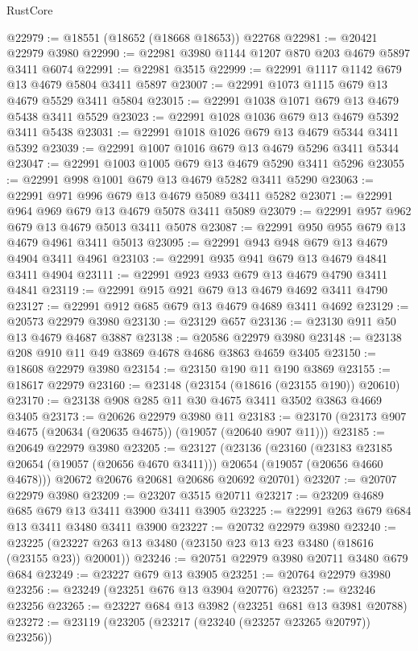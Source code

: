 \begin{lexlean}{RustCore}
\begin{coremodule}
@22979 := @18551 (@18652 (@18668 @18653)) @22768
@22981 := @20421 @22979 @3980
@22990 := @22981 @3980 @1144 @1207 @870 @203 @4679 @5897 @3411 @6074
@22991 := @22981 @3515
@22999 := @22991 @1117 @1142 @679 @13 @4679 @5804 @3411 @5897
@23007 := @22991 @1073 @1115 @679 @13 @4679 @5529 @3411 @5804
@23015 := @22991 @1038 @1071 @679 @13 @4679 @5438 @3411 @5529
@23023 := @22991 @1028 @1036 @679 @13 @4679 @5392 @3411 @5438
@23031 := @22991 @1018 @1026 @679 @13 @4679 @5344 @3411 @5392
@23039 := @22991 @1007 @1016 @679 @13 @4679 @5296 @3411 @5344
@23047 := @22991 @1003 @1005 @679 @13 @4679 @5290 @3411 @5296
@23055 := @22991 @998 @1001 @679 @13 @4679 @5282 @3411 @5290
@23063 := @22991 @971 @996 @679 @13 @4679 @5089 @3411 @5282
@23071 := @22991 @964 @969 @679 @13 @4679 @5078 @3411 @5089
@23079 := @22991 @957 @962 @679 @13 @4679 @5013 @3411 @5078
@23087 := @22991 @950 @955 @679 @13 @4679 @4961 @3411 @5013
@23095 := @22991 @943 @948 @679 @13 @4679 @4904 @3411 @4961
@23103 := @22991 @935 @941 @679 @13 @4679 @4841 @3411 @4904
@23111 := @22991 @923 @933 @679 @13 @4679 @4790 @3411 @4841
@23119 := @22991 @915 @921 @679 @13 @4679 @4692 @3411 @4790
@23127 := @22991 @912 @685 @679 @13 @4679 @4689 @3411 @4692
@23129 := @20573 @22979 @3980
@23130 := @23129 @657
@23136 := @23130 @911 @50 @13 @4679 @4687 @3887
@23138 := @20586 @22979 @3980
@23148 := @23138 @208 @910 @11 @49 @3869 @4678 @4686 @3863 @4659 @3405
@23150 := @18608 @22979 @3980
@23154 := @23150 @190 @11 @190 @3869
@23155 := @18617 @22979
@23160 := @23148 (@23154 (@18616 (@23155 @190)) @20610)
@23170 := @23138 @908 @285 @11 @30 @4675 @3411 @3502 @3863 @4669 @3405
@23173 := @20626 @22979 @3980 @11
@23183 := @23170 (@23173 @907 @4675 (@20634 (@20635 @4675)) (@19057 (@20640 @907 @11)))
@23185 := @20649 @22979 @3980
@23205 := @23127
    (@23136
      (@23160
        (@23183 @23185 @20654 (@19057 (@20656 @4670 @3411)))
        @20654
        (@19057 (@20656 @4660 @4678)))
      @20672
      @20676
      @20681
      @20686
      @20692
      @20701)
@23207 := @20707 @22979 @3980
@23209 := @23207 @3515 @20711
@23217 := @23209 @4689 @685 @679 @13 @3411 @3900 @3411 @3905
@23225 := @22991 @263 @679 @684 @13 @3411 @3480 @3411 @3900
@23227 := @20732 @22979 @3980
@23240 := @23225 (@23227 @263 @13 @3480 (@23150 @23 @13 @23 @3480 (@18616 (@23155 @23)) @20001))
@23246 := @20751 @22979 @3980 @20711 @3480 @679 @684
@23249 := @23227 @679 @13 @3905
@23251 := @20764 @22979 @3980
@23256 := @23249 (@23251 @676 @13 @3904 @20776)
@23257 := @23246 @23256
@23265 := @23227 @684 @13 @3982 (@23251 @681 @13 @3981 @20788)
@23272 := @23119 (@23205 (@23217 (@23240 (@23257 @23265 @20797)) @23256))

\end{coremodule}
\end{lexlean}
